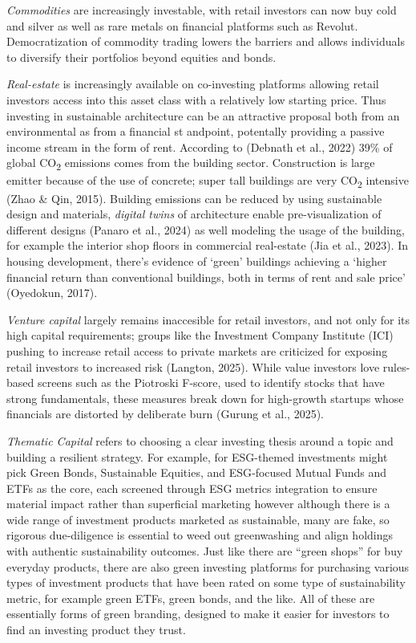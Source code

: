 \documentclass[
  12pt,
  letterpaper,
  DIV=11,
  numbers=noendperiod]{scrartcl}
\begin{document}
\emph{Commodities} are increasingly investable, with retail investors
can now buy cold and silver as well as rare metals on financial
platforms such as Revolut. Democratization of commodity trading lowers
the barriers and allows individuals to diversify their portfolios beyond
equities and bonds.

\emph{Real-estate} is increasingly available on co-investing platforms
allowing retail investors access into this asset class with a relatively
low starting price. Thus investing in sustainable architecture can be an
attractive proposal both from an environmental as from a financial st
andpoint, potentally providing a passive income stream in the form of
rent. According to (Debnath et al., 2022) 39\% of global
CO\textsubscript{2} emissions comes from the building sector.
Construction is large emitter because of the use of concrete; super tall
buildings are very CO\textsubscript{2} intensive (Zhao \& Qin, 2015).
Building emissions can be reduced by using sustainable design and
materials, \emph{digital twins} of architecture enable pre-visualization
of different designs (Panaro et al., 2024) as well modeling the usage of
the building, for example the interior shop floors in commercial
real-estate (Jia et al., 2023). In housing development, there's evidence
of `green' buildings achieving a `higher financial return than
conventional buildings, both in terms of rent and sale price' (Oyedokun,
2017).

\emph{Venture capital} largely remains inaccesible for retail investors,
and not only for its high capital requirements; groups like the
Investment Company Institute (ICI) pushing to increase retail access to
private markets are criticized for exposing retail investors to
increased risk (Langton, 2025). While value investors love rules-based
screens such as the Piotroski F-score, used to identify stocks that have
strong fundamentals, these measures break down for high-growth startups
whose financials are distorted by deliberate burn (Gurung et al., 2025).

\emph{Thematic Capital} refers to choosing a clear investing thesis
around a topic and building a resilient strategy. For example, for
ESG-themed investments might pick Green Bonds, Sustainable Equities, and
ESG‑focused Mutual Funds and ETFs as the core, each screened through ESG
metrics integration to ensure material impact rather than superficial
marketing however although there is a wide range of investment products
marketed as sustainable, many are fake, so rigorous due‑diligence is
essential to weed out greenwashing and align holdings with authentic
sustainability outcomes. Just like there are ``green shops'' for buy
everyday products, there are also green investing platforms for
purchasing various types of investment products that have been rated on
some type of sustainability metric, for example green ETFs, green bonds,
and the like. All of these are essentially forms of green branding,
designed to make it easier for investors to find an investing product
they trust.
\end{document}
